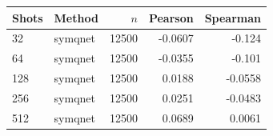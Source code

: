 \begin{tabular}{llrrr}
\toprule
Shots & Method & $n$ & Pearson & Spearman \\
\midrule
32 & symqnet & 12500 & -0.0607 & -0.124 \\
64 & symqnet & 12500 & -0.0355 & -0.101 \\
128 & symqnet & 12500 & 0.0188 & -0.0558 \\
256 & symqnet & 12500 & 0.0251 & -0.0483 \\
512 & symqnet & 12500 & 0.0689 & 0.0061 \\
\bottomrule
\end{tabular}
